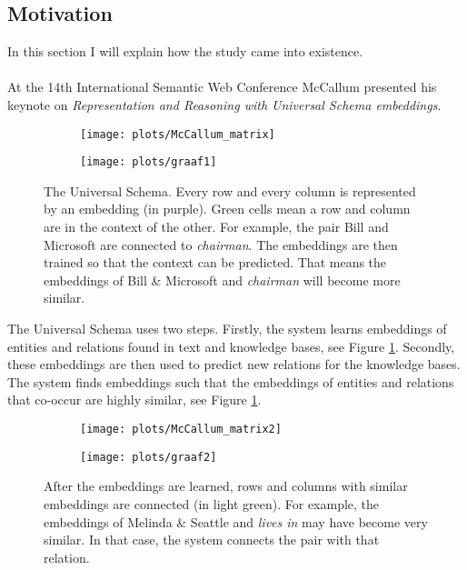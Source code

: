 \documentclass{article}
\begin{document}
 \subsection{Motivation}
 In this section I will explain how the study came into existence.
 \paragraph{}
 At the 14th International Semantic Web Conference McCallum presented his keynote on \emph{Representation and Reasoning with Universal Schema embeddings}\cite{mccallumweblecture}. 
 
 \begin{figure}[H]
 \begin{subfigure}{.475\textwidth}
 \texttt{[image: plots/McCallum\_matrix]}
 \end{subfigure}
 \begin{subfigure}{0.475\textwidth}
 \texttt{[image: plots/graaf1]}
 \end{subfigure}
 \caption[Universal Schema]{The Universal Schema. Every row and every column is represented by an embedding (in purple). Green cells mean a row and column are in the context of the other. For example, the pair Bill and Microsoft are connected to \emph{chairman}.
 The embeddings are then trained so that the context can be predicted. That means the embeddings of Bill \& Microsoft and \emph{chairman} will become more similar.}
 \label{McCallum_matrix}
 \end{figure}

The Universal Schema uses two steps. Firstly, the system learns embeddings of entities and relations found in text and knowledge bases\cite{universalschema}, see Figure \ref{McCallum_matrix}. Secondly, these embeddings are then used to predict new relations for the knowledge bases. The system finds embeddings such that the embeddings of entities and relations that co-occur are highly similar, see Figure \ref{McCallum_matrix}.

 \begin{figure}[H]
 \begin{subfigure}{0.475\textwidth}
 \texttt{[image: plots/McCallum\_matrix2]}
 \end{subfigure}
 \begin{subfigure}{0.475\textwidth}
 \texttt{[image: plots/graaf2]}
 \end{subfigure}
 \caption[Universal Schema predictions]{After the embeddings are learned, rows and columns with similar embeddings are connected (in light green).
 For example, the embeddings of Melinda \& Seattle and \emph{lives in} may have become very similar. In that case, the system connects the pair with that relation.}
 \label{McCallum_matrix2}
 \end{figure}
 
\end{document}
